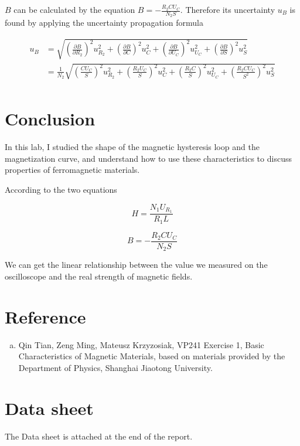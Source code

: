 \documentclass{article}
\begin{document}
$B$ can be calculated by the equation $B=-\frac{R_2CU_C}{N_2S}$. Therefore its uncertainty $u_{B}$ is found by applying the uncertainty propagation formula

\begin{align*}
u_{B}&=\sqrt{\left(\frac{\partial B}{\partial R_2}\right)^2u_{R_2}^2+\left(\frac{\partial B}{\partial C}\right)^2u_{C}^2+\left(\frac{\partial B}{\partial U_C}\right)^2u_{U_C}^2+\left(\frac{\partial B}{\partial S}\right)^2u_{S}^2}\\
&=\frac{1}{N_2}\sqrt{\left(\frac{CU_C}{S}\right)^2u_{R_2}^2+\left(\frac{R_2U_C}{S}\right)^2u_{C}^2+\left(\frac{R_2C}{S}\right)^2u_{U_C}^2+\left(\frac{R_2CU_C}{S^2}\right)^2u_{S}^2}\\
\end{align*}


\section{Conclusion}

In this lab, I studied the shape of the magnetic hysteresis loop and the
magnetization curve, and understand how to use these characteristics to discuss properties of ferromagnetic materials.

According to the two equations

$$H=\frac{N_1U_{R_1}}{R_1L}$$

$$B=-\frac{R_2CU_C}{N_2S}$$

We can get the linear relationship between the value we measured on the oscilloscope and the real strength of magnetic fields.

\section{Reference}

\begin{enumerate}[(a)]
	\item
	Qin Tian, Zeng Ming, Mateusz Krzyzosiak, VP241 Exercise 1, Basic Characteristics of Magnetic Materials, based on materials provided by the Department of Physics, Shanghai Jiaotong University.
\end{enumerate}

\section{Data sheet}

The Data sheet is attached at the end of the report.
\end{document}
